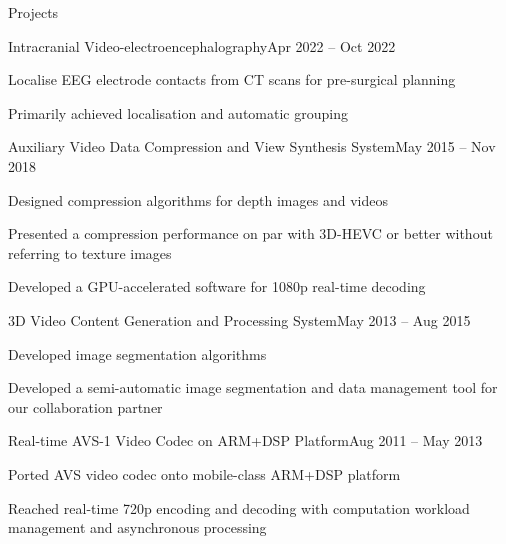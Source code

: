\documentclass{resume} %
\begin{document}

\begin{rSection}{Projects}

	\begin{rSubsection}{Intracranial Video-electroencephalography}{Apr 2022 -- Oct 2022}{}{}
		\item Localise EEG electrode contacts from CT scans for pre-surgical planning
		\item Primarily achieved localisation and automatic grouping
	\end{rSubsection}

	\begin{rSubsection}{Auxiliary Video Data Compression and View Synthesis System}{May 2015 -- Nov 2018}{}{}
		\item Designed compression algorithms for depth images and videos
		\item Presented a compression performance on par with 3D-HEVC or better without referring to texture images
		\item Developed a GPU-accelerated software for 1080p real-time decoding
	\end{rSubsection}
		
	\begin{rSubsection}{3D Video Content Generation and Processing System}{May 2013 -- Aug 2015}{}{}
		\item Developed image segmentation algorithms
		\item Developed a semi-automatic image segmentation and data management tool for our collaboration partner
	\end{rSubsection}
		
	\begin{rSubsection}{Real-time AVS-1 Video Codec on ARM+DSP Platform}{Aug 2011 -- May 2013}{}{}
		\item Ported AVS video codec onto mobile-class ARM+DSP platform
		\item Reached real-time 720p encoding and decoding with computation workload management and asynchronous processing
	\end{rSubsection}

\end{rSection}

\end{document}

